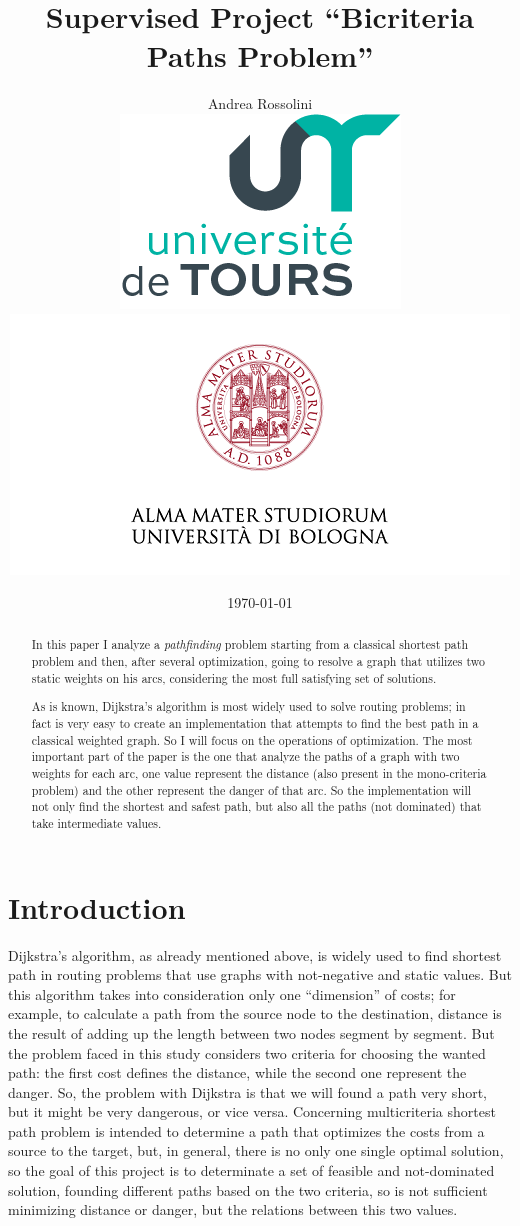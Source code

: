 \documentclass[a4paper,11pt]{report}
\title{Supervised Project ``Bicriteria Paths Problem''
\\
	}
\author{Andrea Rossolini\\
	\includegraphics[scale=0.9]{img/univToursLogo.png}
	\includegraphics[scale=0.6, trim= 0 8mm 0 0, clip]{img/uniboLogo.png}}
\date{\today}
\begin{document}
 
\maketitle

\begin{abstract}
In this paper I analyze a \textit{pathfinding} problem starting from a classical shortest path problem and then, after several optimization, going to resolve a graph that utilizes two static weights on his arcs, considering the most full satisfying set of solutions.

As is known, Dijkstra's algorithm is most widely used to solve routing problems; in fact is very easy to create an implementation that attempts to find the best path in a classical weighted graph. So I will focus on the operations of optimization.
%
The most important part of the paper is the one that analyze the paths of a graph with two weights for each arc, one value represent the distance (also present in the mono-criteria problem) and the other represent the danger of that arc. So the implementation will not only find the shortest and safest path, but also all the paths (not dominated) that take intermediate values.
\end{abstract}

\tableofcontents

\chapter{Introduction}
Dijkstra's algorithm, as already mentioned above, is widely used to find shortest path in routing problems that use graphs with not-negative and static values. But this algorithm takes into consideration only one ``dimension'' of costs; for example, to calculate a path from the source node to the destination, distance is the result of adding up the length between two nodes segment by segment.
%
But the problem faced in this study considers two criteria for choosing the wanted path: the first cost defines the distance, while the second one represent the danger. So, the problem with Dijkstra is that we will found a path very short, but it might be very dangerous, or vice versa. Concerning multicriteria shortest path problem is intended to determine a path that optimizes the costs from a source to the target, but, in general, there is no only one single optimal solution, so the goal of this project is to determinate a set of feasible and not-dominated solution, founding different paths based on the two criteria, so is not sufficient minimizing distance or danger, but the relations between this two values.
\vspace{5mm}
\end{document}
